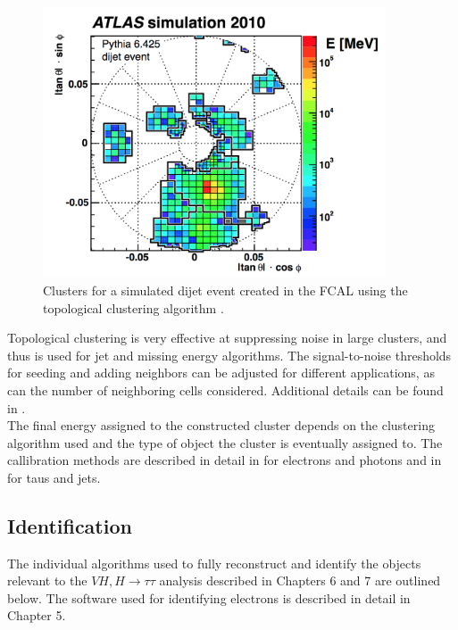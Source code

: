 \begin{figure}[h]
    \centering
    \includegraphics[width=4in]{figures/chapter3/topo_clust.png}
    \caption{Clusters for a simulated dijet event created in the FCAL using the topological clustering algorithm \cite{topo_clustering}.}
    \label{fig:topo}
\end{figure}

Topological clustering is very effective at suppressing noise in large clusters, and thus is used for jet and missing energy algorithms. The signal-to-noise thresholds for seeding and adding neighbors can be adjusted for different applications, as can the number of neighboring cells considered. Additional details can be found in \cite{topo_clustering}.\\

The final energy assigned to the constructed cluster depends on the clustering algorithm used and the type of object the cluster is eventually assigned to. The callibration methods are described in detail in \cite{egam_calib} for electrons and photons and in \cite{had_calib} for taus and jets.\\

\subsection{Identification}\label{sec:id}
The individual algorithms used to fully reconstruct and identify the objects relevant to the $VH,H\rightarrow\tau\tau$ analysis described in Chapters 6 and 7 are outlined below. The software used for identifying electrons is described in detail in Chapter 5. 

